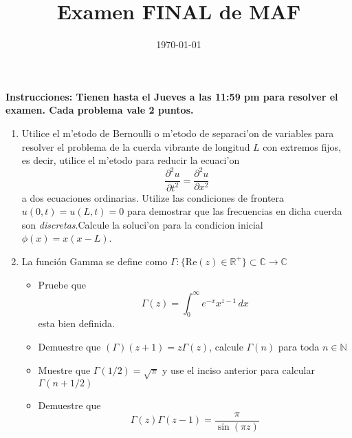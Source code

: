 \documentclass[letterpaper]{article}
\date{\today}
\title{Examen FINAL de MAF}
\newcommand{\nat}{\ensuremath{ \mathbb N }}
\newcommand{\co}{\ensuremath{\mathbb C }}
\newcommand{\re}{\ensuremath{\mathbb R }}
\begin{document}
\maketitle
\noindent\textbf{Instrucciones: Tienen hasta el Jueves a las 11:59 pm para resolver el examen. Cada problema vale 2 puntos.}

\begin{enumerate}
\item Utilice el m'etodo de Bernoulli o m'etodo de separaci'on de variables para resolver el problema de la cuerda vibrante de longitud \(L\) con extremos fijos, es decir, utilice el m'etodo para reducir la ecuaci'on
  \[
  \dfrac{\partial^{2} u}{\partial t^{2}}=\dfrac{\partial^{2}u}{\partial x^{2}}
  \]
  a dos ecuaciones ordinarias. Utilize las condiciones de frontera \(u(0,t)=u(L,t)=0\) para demostrar que las frecuencias en dicha cuerda son \emph{discretas}.Calcule la soluci'on para la condicion inicial $\phi(x)=x(x-L)$.
\item La función Gamma se define como \(\Gamma:\{\textrm{Re}(z)\in\re^{+}\}\subset\co\to\co\)
  \begin{itemize}
    \item Pruebe que
    \[
        \Gamma(z)=\int_0^{\infty}e^{-x}x^{z-1}\,dx
    \]
    esta bien definida.
    \item Demuestre que \((\Gamma)(z+1)=z\Gamma(z)\), calcule \(\Gamma(n)\) para toda \(n\in\nat\)
    \item Muestre que \(\Gamma(1/2)=\sqrt{\pi}\) y use el inciso anterior para calcular \(\Gamma(n+1/2)\)
    \item Demuestre que
          \[
          \Gamma(z)\Gamma(z-1)=\frac{\pi}{\sin(\pi z)}
          \]
  \end{itemize}


\end{enumerate}
\end{document}
